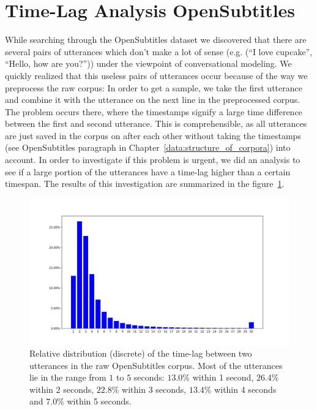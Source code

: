 \section{Time-Lag Analysis OpenSubtitles}
\label{data:opensubtitles:time_lag_analysis}
While searching through the OpenSubtitles dataset we discovered that there are several pairs of utterances which don't make a lot of sense (e.g. (``I love cupcake'', ``Hello, how are you?'')) under the viewpoint of conversational modeling. We quickly realized that this useless pairs of utterances occur because of the way we preprocess the raw corpus: In order to get a sample, we take the first utterance and combine it with the utterance on the next line in the preprocessed corpus. The problem occurs there, where the timestamps signify a large time difference between the first and second utterance. This is comprehensible, as all utterances are just saved in the corpus on after each other without taking the timestamps (see OpenSubtitles paragraph in Chapter~\ref{data:structure_of_corpora}) into account. In order to investigate if this problem is urgent, we did an analysis to see if a large portion of the utterances have a time-lag higher than a certain timespan. The results of this investigation are summarized in the figure~\ref{fig:data:analyse:timediff:opus}.

\begin{figure}[H]
	\centering
	\includegraphics[width=15cm]{img/opus_time_analyze.PNG}
	\caption{Relative distribution (discrete) of the time-lag between two utterances in the raw OpenSubtitles corpus. Most of the utterances lie in the range from $1$ to $5$ seconds: $13.0\%$ within 1 second, $26.4\%$ within 2 seconds, $22.8\%$ within 3 seconds, $13.4\%$ within 4 seconds and  $7.0\%$ within 5 seconds.}
	\label{fig:data:analyse:timediff:opus}
\end{figure}

